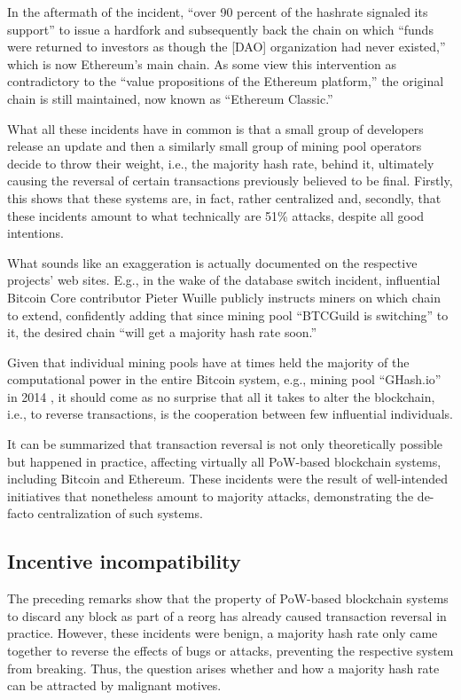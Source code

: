 In the aftermath of the incident, ``over 90 percent of the hashrate signaled its support'' to issue a hardfork and subsequently back the chain on which ``funds were returned to investors as though the [DAO] organization had never existed,'' which is now Ethereum's main chain. \autocite[76]{dhillon2017}
As some view this intervention as contradictory to the ``value propositions of the Ethereum platform,''  the original chain is still maintained, now known as ``Ethereum Classic.'' \autocite[76]{dhillon2017}

What all these incidents have in common is that a small group of developers release an update and then a similarly small group of mining pool operators decide to throw their weight, i.e., the majority hash rate, behind it, ultimately causing the reversal of certain transactions previously believed to be final.
Firstly, this shows that these systems are, in fact, rather centralized and, secondly, that these incidents amount to what technically are 51\% attacks, despite all good intentions.

What sounds like an exaggeration is actually documented on the respective projects' web sites.
E.g., in the wake of the database switch incident, influential Bitcoin Core contributor Pieter Wuille publicly instructs miners on which chain to extend, confidently adding that since mining pool ``BTCGuild is switching'' to it, the desired chain ``will get a majority hash rate soon.'' \autocite{bitcointalkorg2013databaseswitchincident}

Given that individual mining pools have at times held the majority of the computational power in the entire Bitcoin system, e.g., mining pool ``GHash.io'' in 2014 \autocite[222]{boehme2015}, it should come as no surprise that all it takes to alter the blockchain, i.e., to reverse transactions, is the cooperation between few influential individuals.

It can be summarized that transaction reversal is not only theoretically possible but happened in practice, affecting virtually all PoW-based blockchain systems, including Bitcoin and Ethereum.
These incidents were the result of well-intended initiatives that nonetheless amount to majority attacks, demonstrating the de-facto centralization of such systems.

\subsection{Incentive incompatibility}

The preceding remarks show that the property of PoW-based blockchain systems to discard any block as part of a reorg has already caused transaction reversal in practice.
However, these incidents were benign, a majority hash rate only came together to reverse the effects of bugs or attacks, preventing the respective system from breaking.
Thus, the question arises whether and how a majority hash rate can be attracted by malignant motives.

